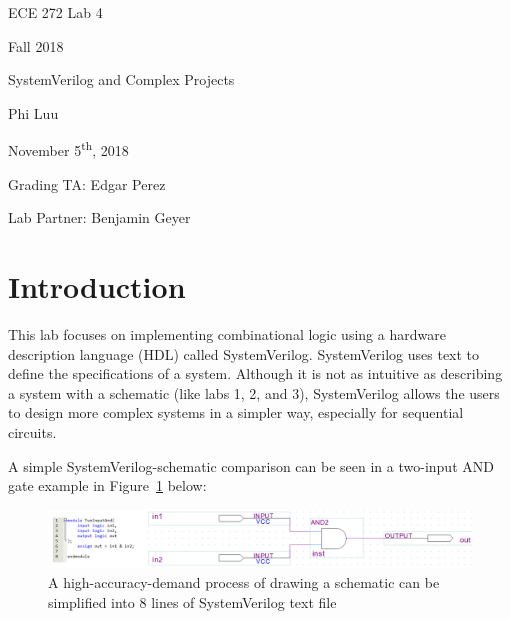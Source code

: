 \documentclass[12pt]{article}
\begin{document}
\begin{titlepage}
  \begin{center} \LARGE
    \vspace*{1.5in}

    ECE 272 Lab 4

    Fall 2018

    \vfill

    SystemVerilog and Complex Projects

    Phi Luu

    \vfill

    November 5\textsuperscript{th}, 2018

    Grading TA: Edgar Perez

    Lab Partner: Benjamin Geyer

    \vspace{1.5in}
  \end{center}
\end{titlepage}

\section{Introduction}

This lab focuses on implementing combinational logic using a hardware description language (HDL) called SystemVerilog. SystemVerilog uses text to define the specifications of a system. Although it is not as intuitive as describing a system with a schematic (like labs 1, 2, and 3), SystemVerilog allows the users to design more complex systems in a simpler way, especially for sequential circuits.

A simple SystemVerilog-schematic comparison can be seen in a two-input AND gate example in Figure~\ref{figure:1} below:

\begin{figure}[ht]
  \centering
  \includegraphics[width=\textwidth]{systemverilog_schematic_comparison.png}
  \caption{A high-accuracy-demand process of drawing a schematic can be simplified into 8 lines of SystemVerilog text file}
  \label{figure:1}
\end{figure}
\end{document}
